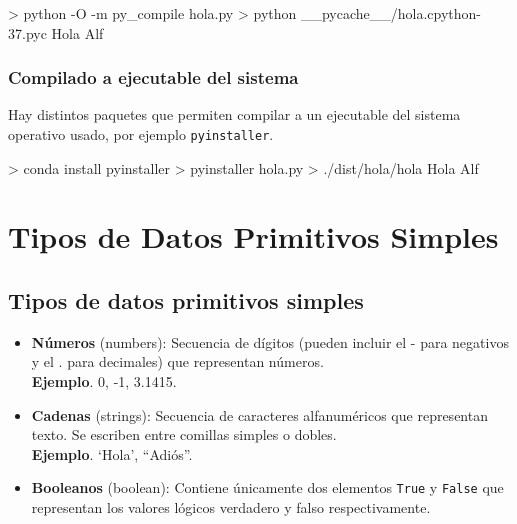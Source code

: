 \documentclass[
  spanish,
  a4paper,
]{scrreport}
\newenvironment{Shaded}{\begin{snugshade}}{\end{snugshade}}
\newcommand{\AttributeTok}[1]{\textcolor[rgb]{0.40,0.45,0.13}{#1}}
\newcommand{\ExtensionTok}[1]{\textcolor[rgb]{0.00,0.23,0.31}{#1}}
\newcommand{\FunctionTok}[1]{\textcolor[rgb]{0.28,0.35,0.67}{#1}}
\newcommand{\NormalTok}[1]{\textcolor[rgb]{0.00,0.23,0.31}{#1}}
\newcommand{\OperatorTok}[1]{\textcolor[rgb]{0.37,0.37,0.37}{#1}}
\providecommand{\tightlist}{%
  \setlength{\itemsep}{0pt}\setlength{\parskip}{0pt}}
\begin{document}
\begin{Shaded}
\begin{Highlighting}[]
\OperatorTok{\textgreater{}}\NormalTok{ python }\ExtensionTok{{-}O} \AttributeTok{{-}m}\NormalTok{ py\_compile hola.py}
\OperatorTok{\textgreater{}}\NormalTok{ python }\ExtensionTok{\_\_pycache\_\_/hola.cpython{-}37.pyc}
\ExtensionTok{Hola}\NormalTok{ Alf}
\end{Highlighting}
\end{Shaded}

\subsection{Compilado a ejecutable del
sistema}\label{compilado-a-ejecutable-del-sistema}

Hay distintos paquetes que permiten compilar a un ejecutable del sistema
operativo usado, por ejemplo \texttt{pyinstaller}.

\begin{Shaded}
\begin{Highlighting}[]
\OperatorTok{\textgreater{}}\NormalTok{ conda }\FunctionTok{install}\NormalTok{ pyinstaller}
\OperatorTok{\textgreater{}}\NormalTok{ pyinstaller }\ExtensionTok{hola.py}
\OperatorTok{\textgreater{}}\NormalTok{ ./dist/hola/hola}
\ExtensionTok{Hola}\NormalTok{ Alf}
\end{Highlighting}
\end{Shaded}


\chapter{Tipos de Datos Primitivos
Simples}\label{tipos-de-datos-primitivos-simples}

\section{Tipos de datos primitivos
simples}\label{tipos-de-datos-primitivos-simples-1}

\begin{itemize}
\tightlist
\item
  \textbf{Números} (numbers): Secuencia de dígitos (pueden incluir el -
  para negativos y el . para decimales) que representan números.\\
  \textbf{Ejemplo}. 0, -1, 3.1415.
\item
  \textbf{Cadenas} (strings): Secuencia de caracteres alfanuméricos que
  representan texto. Se escriben entre comillas simples o dobles.\\
  \textbf{Ejemplo}. `Hola', ``Adiós''.
\item
  \textbf{Booleanos} (boolean): Contiene únicamente dos elementos
  \texttt{True} y \texttt{False} que representan los valores lógicos
  verdadero y falso respectivamente.
\end{itemize}
\end{document}
